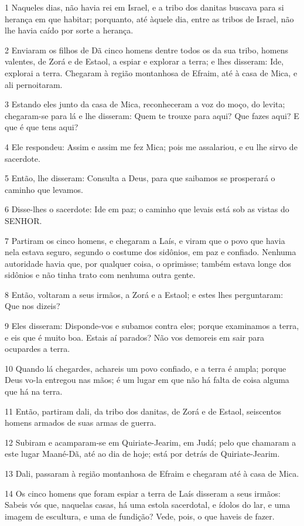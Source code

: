 \par 1 Naqueles dias, não havia rei em Israel, e a tribo dos danitas buscava para si herança em que habitar; porquanto, até àquele dia, entre as tribos de Israel, não lhe havia caído por sorte a herança.
\par 2 Enviaram os filhos de Dã cinco homens dentre todos os da sua tribo, homens valentes, de Zorá e de Estaol, a espiar e explorar a terra; e lhes disseram: Ide, explorai a terra. Chegaram à região montanhosa de Efraim, até à casa de Mica, e ali pernoitaram.
\par 3 Estando eles junto da casa de Mica, reconheceram a voz do moço, do levita; chegaram-se para lá e lhe disseram: Quem te trouxe para aqui? Que fazes aqui? E que é que tens aqui?
\par 4 Ele respondeu: Assim e assim me fez Mica; pois me assalariou, e eu lhe sirvo de sacerdote.
\par 5 Então, lhe disseram: Consulta a Deus, para que saibamos se prosperará o caminho que levamos.
\par 6 Disse-lhes o sacerdote: Ide em paz; o caminho que levais está sob as vistas do SENHOR.
\par 7 Partiram os cinco homens, e chegaram a Laís, e viram que o povo que havia nela estava seguro, segundo o costume dos sidônios, em paz e confiado. Nenhuma autoridade havia que, por qualquer coisa, o oprimisse; também estava longe dos sidônios e não tinha trato com nenhuma outra gente.
\par 8 Então, voltaram a seus irmãos, a Zorá e a Estaol; e estes lhes perguntaram: Que nos dizeis?
\par 9 Eles disseram: Disponde-vos e subamos contra eles; porque examinamos a terra, e eis que é muito boa. Estais aí parados? Não vos demoreis em sair para ocupardes a terra.
\par 10 Quando lá chegardes, achareis um povo confiado, e a terra é ampla; porque Deus vo-la entregou nas mãos; é um lugar em que não há falta de coisa alguma que há na terra.
\par 11 Então, partiram dali, da tribo dos danitas, de Zorá e de Estaol, seiscentos homens armados de suas armas de guerra.
\par 12 Subiram e acamparam-se em Quiriate-Jearim, em Judá; pelo que chamaram a este lugar Maané-Dã, até ao dia de hoje; está por detrás de Quiriate-Jearim.
\par 13 Dali, passaram à região montanhosa de Efraim e chegaram até à casa de Mica.
\par 14 Os cinco homens que foram espiar a terra de Laís disseram a seus irmãos: Sabeis vós que, naquelas casas, há uma estola sacerdotal, e ídolos do lar, e uma imagem de escultura, e uma de fundição? Vede, pois, o que haveis de fazer.
